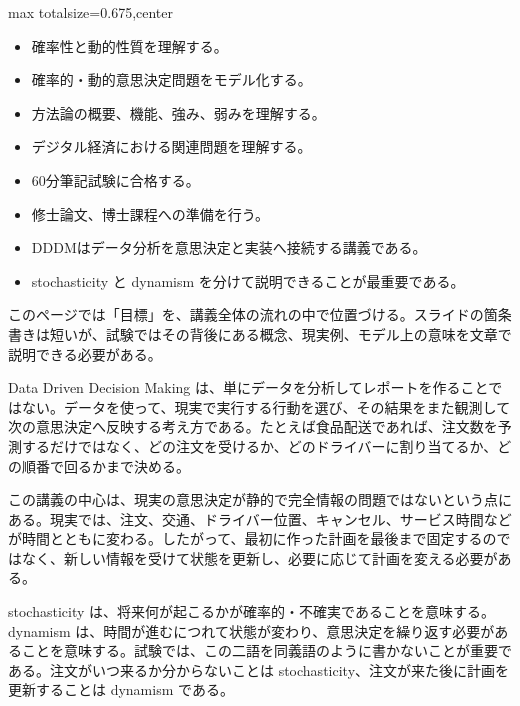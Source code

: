 \clearpage
{}
\begin{adjustbox}{max totalsize={\textwidth}{0.675\textheight},center}
\begin{minipage}{\textwidth}\scriptsize
\begin{minipage}[t]{0.485\textwidth}
\begin{itemize}
\item 確率性と動的性質を理解する。
\item 確率的・動的意思決定問題をモデル化する。
\item 方法論の概要、機能、強み、弱みを理解する。
\item デジタル経済における関連問題を理解する。
\item 60分筆記試験に合格する。
\item 修士論文、博士課程への準備を行う。
\end{itemize}
\begin{itemize}
\item DDDMはデータ分析を意思決定と実装へ接続する講義である。
\item stochasticity と dynamism を分けて説明できることが最重要である。
\end{itemize}
\end{minipage}\hfill
\begin{minipage}[t]{0.485\textwidth}
このページでは「目標」を、講義全体の流れの中で位置づける。スライドの箇条書きは短いが、試験ではその背後にある概念、現実例、モデル上の意味を文章で説明できる必要がある。\par
Data Driven Decision Making は、単にデータを分析してレポートを作ることではない。データを使って、現実で実行する行動を選び、その結果をまた観測して次の意思決定へ反映する考え方である。たとえば食品配送であれば、注文数を予測するだけではなく、どの注文を受けるか、どのドライバーに割り当てるか、どの順番で回るかまで決める。\par
この講義の中心は、現実の意思決定が静的で完全情報の問題ではないという点にある。現実では、注文、交通、ドライバー位置、キャンセル、サービス時間などが時間とともに変わる。したがって、最初に作った計画を最後まで固定するのではなく、新しい情報を受けて状態を更新し、必要に応じて計画を変える必要がある。\par
stochasticity は、将来何が起こるかが確率的・不確実であることを意味する。dynamism は、時間が進むにつれて状態が変わり、意思決定を繰り返す必要があることを意味する。試験では、この二語を同義語のように書かないことが重要である。注文がいつ来るか分からないことは stochasticity、注文が来た後に計画を更新することは dynamism である。\par

\end{minipage}
\end{minipage}
\end{adjustbox}
